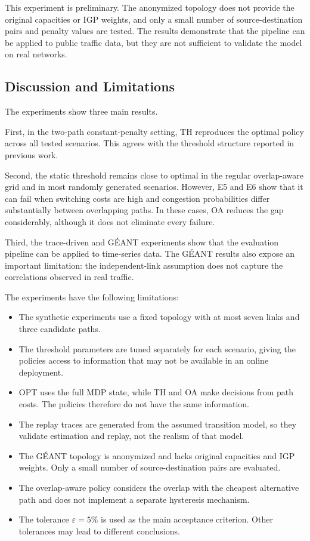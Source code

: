 \documentclass{amsart}
\begin{document}
This experiment is preliminary. The anonymized topology does not
provide the original capacities or IGP weights, and only a small
number of source-destination pairs and penalty values are tested.
The results demonstrate that the pipeline can be applied to
public traffic data, but they are not sufficient to validate the
model on real networks.

\subsection{Discussion and Limitations}
\label{sec:interp}

The experiments show three main results.

First, in the two-path constant-penalty setting, TH reproduces
the optimal policy across all tested scenarios. This agrees with
the threshold structure reported in previous work.

Second, the static threshold remains close to optimal in the
regular overlap-aware grid and in most randomly generated
scenarios. However, E5 and E6 show that it can fail when switching
costs are high and congestion probabilities differ substantially
between overlapping paths. In these cases, OA reduces the gap
considerably, although it does not eliminate every failure.

Third, the trace-driven and GÉANT experiments show that the
evaluation pipeline can be applied to time-series data. The
GÉANT results also expose an important limitation: the
independent-link assumption does not capture the correlations
observed in real traffic.

The experiments have the following limitations:
\begin{itemize}
    \item The synthetic experiments use a fixed topology with at
    most seven links and three candidate paths.
    \item The threshold parameters are tuned separately for each
    scenario, giving the policies access to information that may
    not be available in an online deployment.
    \item OPT uses the full MDP state, while TH and OA make
    decisions from path costs. The policies therefore do not have
    the same information.
    \item The replay traces are generated from the assumed
    transition model, so they validate estimation and replay,
    not the realism of that model.
    \item The GÉANT topology is anonymized and lacks original
    capacities and IGP weights. Only a small number of
    source-destination pairs are evaluated.
    \item The overlap-aware policy considers the overlap with the
    cheapest alternative path and does not implement a separate
    hysteresis mechanism.
    \item The tolerance $\varepsilon=5\%$ is used as the main
    acceptance criterion. Other tolerances may lead to different
    conclusions.
\end{itemize}
\end{document}
